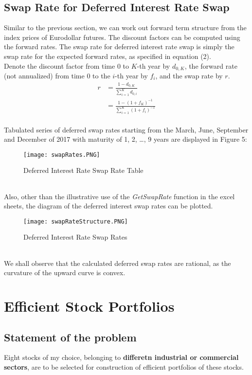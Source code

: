 \newpage

\subsection{Swap Rate for Deferred Interest Rate Swap}
Similar to the previous section, we can work out forward term structure from the index prices of Eurodollar futures. The discount factors can be computed using the forward rates. The swap rate for deferred interest rate swap is simply the swap rate for the expected forward rates, as specified in equation (2).
\\Denote the discount factor from time 0 to $K$-th year by $d_{0,K}$, the forward rate (not annualized) from time 0 to the $i$-th year by $f_{i}$, and the swap rate by $r$.
\begin{equation}
\begin{split}
r &= \frac{1 - d_{0,K}}{\sum_{i=1}^{K} d_{0,i}}\\
&= \frac{1 - (1 + f_{K})^{-1}}{\sum_{i=1}^{K} (1 + f_{i})^{-1}}
\end{split}
\end{equation}
\\Tabulated series of deferred swap rates starting from the March, June, September and December of 2017 with maturity of 1, 2, \dots, 9 years are displayed in Figure 5:
\begin{figure}[h]
	\centering
	\texttt{[image: swapRates.PNG]}
	\caption{Deferred Interest Rate Swap Rate Table}
\end{figure}
\\Also, other than the illustrative use of the \emph{GetSwapRate} function in the excel sheets, the diagram of the deferred interest swap rates can be plotted.
\begin{figure}[h]
	\centering
	\texttt{[image: swapRateStructure.PNG]}
	\caption{Deferred Interest Rate Swap Rates}
\end{figure}
\\We shall observe that the calculated deferred swap rates are rational, as the curvature of the upward curve is convex.
\newpage

\section{Efficient Stock Portfolios}
\subsection*{Statement of the problem}
Eight stocks of my choice, belonging to \textbf{differetn industrial or commercial sectors}, are to be selected for construction of efficient portfolios of these stocks.
